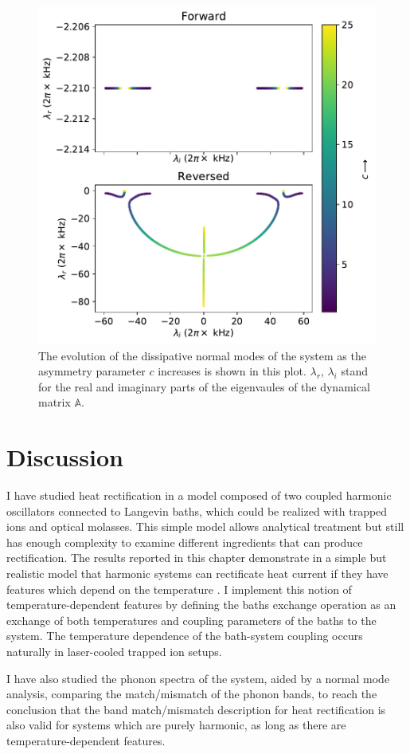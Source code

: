 \begin{figure}
  \center
  \includegraphics[width=0.9\linewidth]{Figures/Eigenvals_NormalModes.pdf}
  \caption{The evolution of the dissipative normal modes of the system as the asymmetry parameter $c$ increases is shown in this plot. $\lambda_r$, $\lambda_i$ stand for the real and imaginary parts of the eigenvaules of the dynamical matrix $\mathbb{A}$.}
  \label{fig:Figure_Eigenvals_NormalModes}
\end{figure}


%
\section{Discussion \label{sec:chapter6_Discussion}}
%
I have studied heat rectification in a model composed of two coupled harmonic oscillators connected to Langevin baths, which could be realized with trapped ions and optical molasses. This simple model allows analytical treatment but still has enough complexity to examine different ingredients that can produce rectification. The results reported in this chapter demonstrate in a simple but realistic model that harmonic systems can rectificate heat current if they have features which depend on the temperature  \cite{Pereira2017}. I implement this notion of temperature-dependent features by defining the baths exchange operation as an exchange of both temperatures and coupling parameters of the baths to the system. The temperature dependence of the bath-system coupling  occurs naturally in laser-cooled trapped ion setups.

I have also studied the phonon spectra of the system, aided by a normal mode analysis,
comparing the match/mismatch of the phonon bands, to reach the conclusion that the band match/mismatch description for heat rectification is also valid for systems which are purely harmonic, as long as there are temperature-dependent features.
